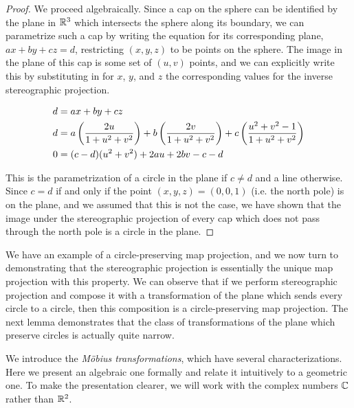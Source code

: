 \begin{proof}
  We proceed algebraically.  Since a cap on the sphere can be
  identified by the plane in $\mathbb{R}^3$ which intersects the sphere along
  its boundary, we can parametrize such a cap by writing the equation
  for its corresponding plane, $ax+by+cz=d$, restricting $(x,y,z)$ to
  be points on the sphere.  The image in the plane of this cap is some
  set of $(u,v)$ points, and we can explicitly write this by
  substituting in for $x$, $y$, and $z$ the corresponding values for
  the inverse stereographic projection.  

  \begin{align*}
    d&=ax+by+cz\\
    d&=a\left(\frac{2u}{1+u^2+v^2}\right)+b\left(\frac{2v}{1+u^2+v^2}\right)+c\left(\frac{u^2+v^2-1}{1+u^2+v^2}\right)\\
    \mute{d&=a\left(\frac{2u}{1+\mathcal{W}}\right)+b\left(\frac{2v}{1+\mathcal{W}}\right)+c\left(\frac{\mathcal{W}-1}{1+\mathcal{W}}\right)\\
    d\left(1+\mathcal{W}\right)&=2au+2bv+c\left(\mathcal{W}-1\right)\\ 
    0 &=    (c-d)\mathcal{W} + 2au +2bv - c - d\\}
    0 &= (c-d)(u^2+v^2)+2au+2bv - c - d
  \end{align*}

  This  is the parametrization of a circle in the plane if $c\neq d$
  and a line otherwise.  Since $c=d$ if and only if the point
  $(x,y,z)=(0,0,1)$ (i.e. the north pole) is on the plane, and we
  assumed that this is not the case, we have shown that the image
  under the stereographic projection of every cap which does not pass
  through the north pole is a circle in the plane.

\end{proof}

We have an example of a  circle-preserving map projection, and we now
turn to demonstrating that the stereographic projection is essentially
the unique map projection with this property.  We can observe that if
we perform stereographic projection and compose it with
a transformation of the plane which sends every circle to a circle,
then this composition is a circle-preserving map projection.  The next
lemma demonstrates that the class of transformations of the plane
which preserve circles is actually quite narrow.


We introduce the \textit{M\"obius transformations}, which have several characterizations.  Here we present an algebraic one formally and relate it intuitively to a geometric one.  To make the presentation clearer, we will work with the complex numbers $\mathbb{C}$ rather than $\mathbb{R}^2$.

